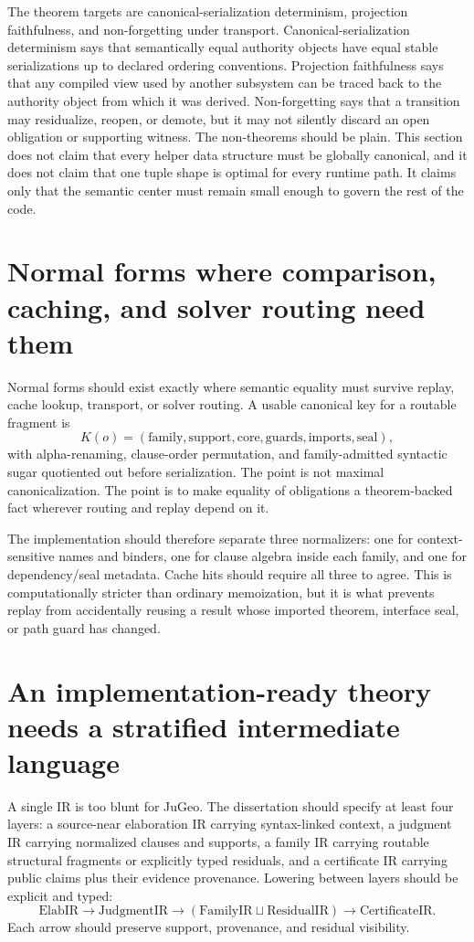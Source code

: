\documentclass[11pt]{report}
\begin{document}
The theorem targets are canonical-serialization determinism, projection faithfulness, and non-forgetting under transport. Canonical-serialization determinism says that semantically equal authority objects have equal stable serializations up to declared ordering conventions. Projection faithfulness says that any compiled view used by another subsystem can be traced back to the authority object from which it was derived. Non-forgetting says that a transition may residualize, reopen, or demote, but it may not silently discard an open obligation or supporting witness. The non-theorems should be plain. This section does not claim that every helper data structure must be globally canonical, and it does not claim that one tuple shape is optimal for every runtime path. It claims only that the semantic center must remain small enough to govern the rest of the code.
\section{Normal forms where comparison, caching, and solver routing need them}
Normal forms should exist exactly where semantic equality must survive replay, cache lookup, transport, or solver routing. A usable canonical key for a routable fragment is
\[
K(o) = (\mathrm{family}, \mathrm{support}, \mathrm{core}, \mathrm{guards}, \mathrm{imports}, \mathrm{seal}),
\]
with alpha-renaming, clause-order permutation, and family-admitted syntactic sugar quotiented out before serialization. The point is not maximal canonicalization. The point is to make equality of obligations a theorem-backed fact wherever routing and replay depend on it.

The implementation should therefore separate three normalizers: one for context-sensitive names and binders, one for clause algebra inside each family, and one for dependency/seal metadata. Cache hits should require all three to agree. This is computationally stricter than ordinary memoization, but it is what prevents replay from accidentally reusing a result whose imported theorem, interface seal, or path guard has changed.

\section{An implementation-ready theory needs a stratified intermediate language}
A single IR is too blunt for JuGeo. The dissertation should specify at least four layers: a source-near elaboration IR carrying syntax-linked context, a judgment IR carrying normalized clauses and supports, a family IR carrying routable structural fragments or explicitly typed residuals, and a certificate IR carrying public claims plus their evidence provenance. Lowering between layers should be explicit and typed:
\[
\mathrm{ElabIR} \to \mathrm{JudgmentIR} \to (\mathrm{FamilyIR} \sqcup \mathrm{ResidualIR}) \to \mathrm{CertificateIR}.
\]
Each arrow should preserve support, provenance, and residual visibility.
\end{document}

